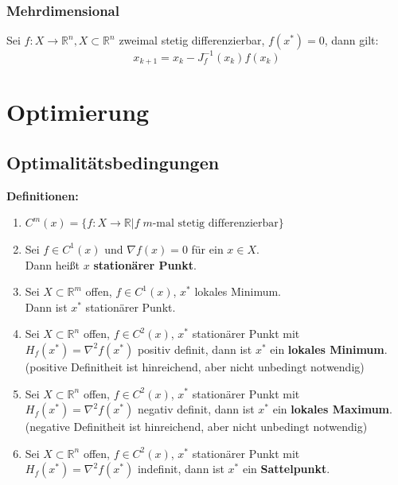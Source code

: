 \documentclass[a4paper,twocolumn,10pt]{article}
\begin{document}
\subsubsection{Mehrdimensional}
Sei $f:X\rightarrow\mathbb{R}^n,X\subset\mathbb{R}^n$ zweimal stetig differenzierbar, $f(x^*)=0$, dann gilt:
\begin{equation*}
x_{k+1}=x_k-J_f^{-1}(x_k)f(x_k)
\end{equation*}

\section{Optimierung}

\subsection{Optimalitätsbedingungen}
\textbf{Definitionen:}
\begin{enumerate}[label=$\bullet$]
\item $C^m(x)=\{f:X\rightarrow\mathbb{R}|f\;m\text{-mal stetig differenzierbar}\}$
\item Sei $f\in C^1(x)$ und $\nabla f(x)=0$ für ein $x\in X$.\\
Dann heißt $x$ \textbf{stationärer Punkt}.
\item Sei $X\subset\mathbb{R}^m$ offen, $f\in C^1(x)$, $x^*$ lokales Minimum.\\
Dann ist $x^*$ stationärer Punkt.
\item Sei $X\subset\mathbb{R}^n$ offen, $f\in C^2(x)$, $x^*$ stationärer Punkt mit $H_f(x^*)=\nabla^2f(x^*)$ positiv definit, dann ist $x^*$ ein \textbf{lokales Minimum}.\\
(positive Definitheit ist hinreichend, aber nicht unbedingt notwendig)
\item Sei $X\subset\mathbb{R}^n$ offen, $f\in C^2(x)$, $x^*$ stationärer Punkt mit $H_f(x^*)=\nabla^2f(x^*)$ negativ definit, dann ist $x^*$ ein \textbf{lokales Maximum}.\\
(negative Definitheit ist hinreichend, aber nicht unbedingt notwendig)
\item Sei $X\subset\mathbb{R}^n$ offen, $f\in C^2(x)$, $x^*$ stationärer Punkt mit $H_f(x^*)=\nabla^2f(x^*)$ indefinit, dann ist $x^*$ ein \textbf{Sattelpunkt}.\\
\end{enumerate}
\end{document}
